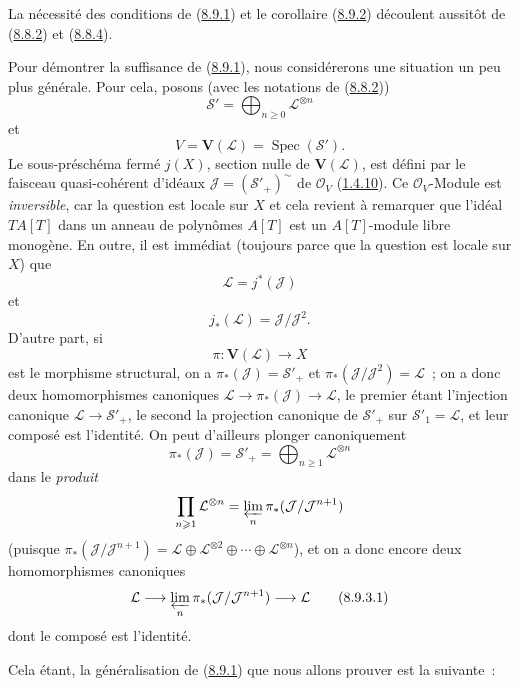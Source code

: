 \begin{env}[8.9.3]
\label{II.8.9.3-fr}
La nécessité des conditions de (\hyperref[II.8.9.1-fr]{8.9.1}) et le
corollaire (\hyperref[II.8.9.2-fr]{8.9.2}) découlent aussitôt de
(\hyperref[II.8.8.2-fr]{8.8.2}) et
(\hyperref[II.8.8.4-fr]{8.8.4}).

Pour démontrer la suffisance de (\hyperref[II.8.9.1-fr]{8.9.1}), nous
considérerons une situation un peu plus générale. Pour cela, posons (avec les
notations de (\hyperref[II.8.8.2-fr]{8.8.2}))
\[
  \mathcal{S}'=\bigoplus_{n\geqslant 0}\mathcal{L}^{\otimes n}
\]
et
\[
  V=\mathbf{V}(\mathcal{L})=\operatorname{Spec}(\mathcal{S}').
\]
Le sous-préschéma fermé $j(X)$, section nulle de $\mathbf{V}(\mathcal{L})$,
est défini par le faisceau quasi-cohérent d'idéaux
$\mathcal{J}=(\mathcal{S}'_+)^{\sim}$ de $\mathcal{O}_V$
(\hyperref[II.1.4.10-fr]{1.4.10}). Ce $\mathcal{O}_V$-Module est
\emph{inversible}, car la question est locale sur $X$ et cela revient à
remarquer que l'idéal $TA[T]$ dans un anneau de polynômes $A[T]$ est un
$A[T]$-module libre monogène. En outre, il est immédiat (toujours parce que la
question est locale sur $X$) que
\[
  \mathcal{L}=j^*(\mathcal{J})
\]
et
\[
  j_*(\mathcal{L})=\mathcal{J}/\mathcal{J}^2.
\]
D'autre part, si
\[
  \pi:\mathbf{V}(\mathcal{L})\longrightarrow X
\]
est le morphisme structural, on a
$\pi_*(\mathcal{J})=\mathcal{S}'_+$ et
$\pi_*(\mathcal{J}/\mathcal{J}^2)=\mathcal{L}$~; on a donc deux
homomorphismes canoniques
$\mathcal{L}\to\pi_*(\mathcal{J})\to\mathcal{L}$, le premier étant
l'injection canonique $\mathcal{L}\to\mathcal{S}'_+$, le second la projection
canonique de $\mathcal{S}'_+$ sur $\mathcal{S}'_1=\mathcal{L}$, et leur
composé est l'identité. On peut d'ailleurs plonger canoniquement
\[
  \pi_*(\mathcal{J})=\mathcal{S}'_+
  =\bigoplus_{n\geqslant 1}\mathcal{L}^{\otimes n}
\]
dans le \emph{produit}
\[
  \prod_{n\geqslant 1}\mathcal{L}^{\otimes n}
  =\varprojlim_n\pi_*(\mathcal{J}/\mathcal{J}^{n+1})
\]
(puisque
$\pi_*(\mathcal{J}/\mathcal{J}^{n+1})=
\mathcal{L}\oplus\mathcal{L}^{\otimes2}\oplus\cdots\oplus
\mathcal{L}^{\otimes n}$), et on a donc encore deux homomorphismes canoniques
\begin{equation}
\label{II.8.9.3.1-fr}
  \mathcal{L}\longrightarrow
  \varprojlim_n\pi_*(\mathcal{J}/\mathcal{J}^{n+1})
  \longrightarrow\mathcal{L}
\tag{8.9.3.1}
\end{equation}
dont le composé est l'identité.

Cela étant, la généralisation de (\hyperref[II.8.9.1-fr]{8.9.1}) que nous
allons prouver est la suivante~:
\end{env}

